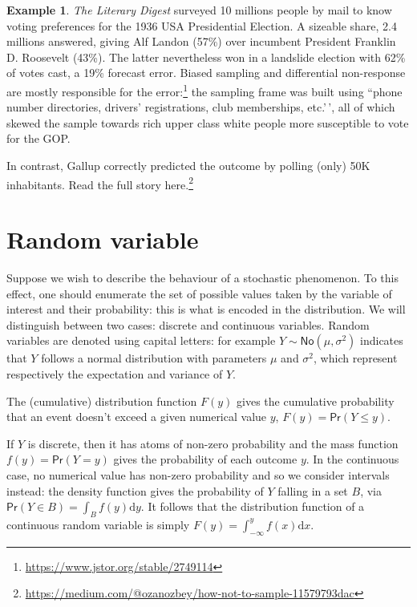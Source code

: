 \documentclass[
  11pt,
  letterpaper,
]{book}
\renewcommand{\href}[2]{#2\footnote{\url{#1}}}
\theoremstyle{definition}
\theoremstyle{definition}
\newtheorem{example}{Example}[chapter]
\theoremstyle{definition}
\theoremstyle{remark}
\begin{document}
\begin{example}
\protect\hypertarget{exm:Galluppoll}{}{\label{exm:Galluppoll} }
\emph{The Literary Digest} surveyed 10 millions people by mail to know voting preferences for the 1936 USA Presidential Election. A sizeable share, 2.4 millions answered, giving Alf Landon (57\%) over incumbent President Franklin D. Roosevelt (43\%). The latter nevertheless won in a landslide election with 62\% of votes cast, a 19\% forecast error. \href{https://www.jstor.org/stable/2749114}{Biased sampling and differential non-response are mostly responsible for the error:} the sampling frame was built using ``phone number directories, drivers' registrations, club memberships, etc.'\,', all of which skewed the sample towards rich upper class white people more susceptible to vote for the GOP.

In contrast, Gallup correctly predicted the outcome by polling (only) 50K inhabitants. \href{https://medium.com/@ozanozbey/how-not-to-sample-11579793dac}{Read the full story here.}
\end{example}

\hypertarget{random-variable}{%
\section{Random variable}\label{random-variable}}

Suppose we wish to describe the behaviour of a stochastic phenomenon. To this effect, one should enumerate the set of possible values taken by the variable of interest and their probability: this is what is encoded in the distribution. We will distinguish between two cases: discrete and continuous variables. Random variables are denoted using capital letters: for example \(Y \sim \mathsf{No}(\mu, \sigma^2)\) indicates that \(Y\) follows a normal distribution with parameters \(\mu\) and \(\sigma^2\), which represent respectively the expectation and variance of \(Y\).

The (cumulative) distribution function \(F(y)\) gives the cumulative probability that an event doesn't exceed a given numerical value \(y\), \(F(y) = \mathsf{Pr}(Y \leq y)\).

If \(Y\) is discrete, then it has atoms of non-zero probability and the mass function \(f(y)=\mathsf{Pr}(Y=y)\) gives the probability of each outcome \(y\). In the continuous case, no numerical value has non-zero probability and so we consider intervals instead: the density function gives the probability of \(Y\) falling in a set \(B\), via \(\mathsf{Pr}(Y \in B) = \int_B f(y) \mathrm{d} y\). It follows that the distribution function of a continuous random variable is simply \(F(y) = \int_{-\infty}^y f(x) \mathrm{d} x\).
\end{document}
